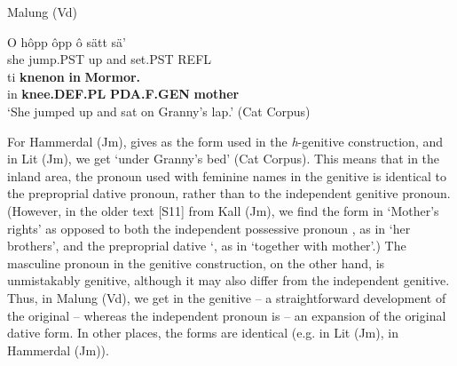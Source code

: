 Malung (Vd)



 \ea\label{}
\gll O  hôpp  ôpp  ô  sätt  sä’  \\


she  jump.PST  up  and  set.PST  REFL  \\

 \ea\label{}
\gll ti  \textbf{knenon} \textbf{in} \textbf{Mormor.}\\


in  \textbf{knee.DEF.PL} \textbf{PDA.F.GEN} \textbf{mother}\\

\glt ‘She jumped up and sat on Granny’s lap.’ (Cat Corpus)

\z

For Hammerdal (Jm), \citet{Reinhammar2005} gives  as the form used in the \textit{h}{}-genitive construction, and in Lit (Jm), we get  ‘under Granny’s bed’ (Cat Corpus). This means that in the inland area, the pronoun used with feminine names in the genitive is identical to the preproprial dative pronoun, rather than to the independent genitive pronoun. (However, in the older text [S11] from Kall (Jm), we find the form  in  ‘Mother’s rights’ as opposed to both the independent possessive pronoun , as in  ‘her brothers’, and the preproprial dative ‘, as in  ‘together with mother’.) The masculine pronoun in the genitive construction, on the other hand, is unmistakably genitive, although it may also differ from the independent genitive. Thus, in Malung (Vd), we get  in the genitive – a straightforward development of the original  – whereas the independent pronoun is  – an expansion of the original dative form. In other places, the forms are identical (e.g.  in Lit (Jm),  in Hammerdal (Jm)). 


